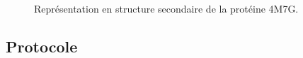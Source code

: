 
\begin{figure}[H]
   \centering
   \caption{Représentation en structure secondaire de la protéine 4M7G. }
   \label{fig:struct_secondaires}
\end{figure}


\subsection{Protocole}


